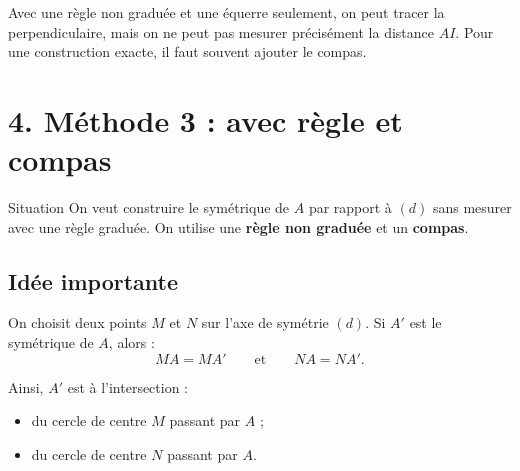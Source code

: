 \documentclass[11pt,a4paper]{article}
\begin{document}
\begin{attention}
Avec une règle non graduée et une équerre seulement, on peut tracer la perpendiculaire, mais on ne peut pas mesurer précisément la distance $AI$.  
Pour une construction exacte, il faut souvent ajouter le compas.
\end{attention}

\begin{center}
\end{center}

\section*{4. Méthode 3 : avec règle et compas}

\begin{boite}{Situation}
On veut construire le symétrique de $A$ par rapport à $(d)$ sans mesurer avec une règle graduée.  
On utilise une \textbf{règle non graduée} et un \textbf{compas}.
\end{boite}

\subsection*{Idée importante}

On choisit deux points $M$ et $N$ sur l'axe de symétrie $(d)$.  
Si $A'$ est le symétrique de $A$, alors :
\[
MA=MA'
\qquad \text{et} \qquad
NA=NA'.
\]

Ainsi, $A'$ est à l'intersection :
\begin{itemize}[label=\textbullet]
    \item du cercle de centre $M$ passant par $A$ ;
    \item du cercle de centre $N$ passant par $A$.
\end{itemize}
\end{document}

